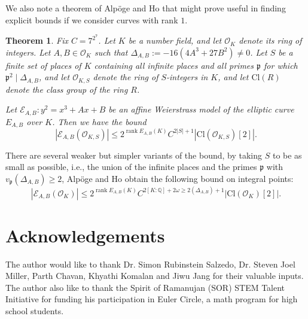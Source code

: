 \documentclass[12pt]{amsart}
\theoremstyle{plain}
\newtheorem{thm}{Theorem}
\theoremstyle{definition}
\theoremstyle{remark}
\numberwithin{equation}{section}
\numberwithin{thm}{section}
\theoremstyle{named}
\theoremstyle{named}
\begin{document}
We also note a theorem of {Alpöge and Ho} that might prove useful in finding explicit bounds if we consider curves with rank $1.$
\begin{thm}
Fix $C=7^{2^7}$. Let $K$ be a number field, and let $\mathcal{O}_K$ denote its ring of integers. Let $A, B \in \mathcal{O}_K$ such that $\Delta_{A, B}:=-16\left(4 A^3+27 B^2\right) \neq 0$. Let $S$ be a finite set of places of $K$ containing all infinite places and all primes $\mathfrak{p}$ for which $\mathfrak{p}^2 \mid \Delta_{A, B}$, and let $\mathcal{O}_{K, S}$ denote the ring of $S$-integers in $K$, and let $\mathrm{Cl}(R)$ denote the class group of the ring $R$.

Let $\mathcal{E}_{A, B}: y^2=x^3+A x+B$ be an affine Weierstrass model of the elliptic curve $E_{A, B}$ over $K$. Then we have the bound
$$
\left|\mathcal{E}_{A, B}\left(\mathcal{O}_{K, S}\right)\right| \leq 2^{\operatorname{rank} E_{A, B}(K)} C^{2|S|+1}\left|\mathrm{Cl}\left(\mathcal{O}_{K, S}\right)[2]\right| .
$$
\end{thm}
There are several weaker but simpler variants of the bound, by taking $S$ to be as small as possible, i.e., the union of the infinite places and the primes $\mathfrak{p}$ with $v_{\mathfrak{p}}\left(\Delta_{A, B}\right) \geq 2$, {Alpöge and Ho} obtain the following bound on integral points:
$$
\left|\mathcal{E}_{A, B}\left(\mathcal{O}_K\right)\right| \leq 2^{\operatorname{rank} E_{A, B}(K)} C^{2[K: \mathbb{Q}]+2 \omega \geq 2\left(\Delta_{A, B}\right)+1}\left|\mathrm{Cl}\left(\mathcal{O}_K\right)[2]\right|.
$$

\section{Acknowledgements}
The author would like to thank Dr. Simon Rubinstein Salzedo, Dr. Steven Joel Miller, Parth Chavan, Khyathi Komalan and Jiwu Jang for their valuable inputs. The author also like to thank the Spirit of Ramanujan (SOR) STEM Talent Initiative for funding his participation in Euler Circle, a math program for high school students.
 

\end{document}
